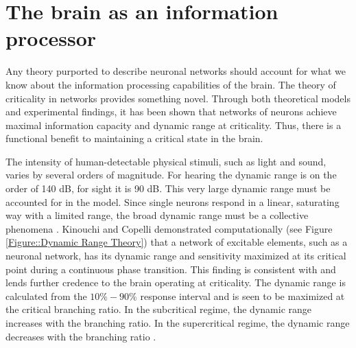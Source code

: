 \documentclass[12pt]{article}
\begin{document}
\section*{The brain as an information processor}

Any theory purported to describe neuronal networks should account for what we know about the information processing capabilities of the brain. The theory of criticality in networks provides something novel. Through both theoretical models and experimental findings, it has been shown that networks of neurons achieve maximal information capacity and dynamic range at criticality. Thus, there is a functional benefit to maintaining a critical state in the brain.
   
The intensity of human-detectable physical stimuli, such as light and sound, varies by several orders of magnitude. For hearing the dynamic range is on the order of 140 dB, for sight it is 90 dB. This very large dynamic range must be accounted for in the model. Since single neurons respond in a linear, saturating way with a limited range, the broad dynamic range must be a collective phenomena \cite{Kinouchi2006b}. Kinouchi and Copelli demonstrated computationally (see Figure \ref{Figure::Dynamic Range Theory}) that a network of excitable elements, such as a neuronal network, has its dynamic range and sensitivity maximized at its critical point during a continuous phase transition\cite{Kinouchi2006b}. This finding is consistent with and lends further credence to the brain operating at criticality. The dynamic range is calculated from the $10\%-90\%$ response interval and is seen to be maximized at the critical branching ratio. In the subcritical regime, the dynamic range increases with the branching ratio. In the supercritical regime, the dynamic range decreases with the branching ratio \cite{Larremore2011a, Larremore2012a}.
\end{document}
